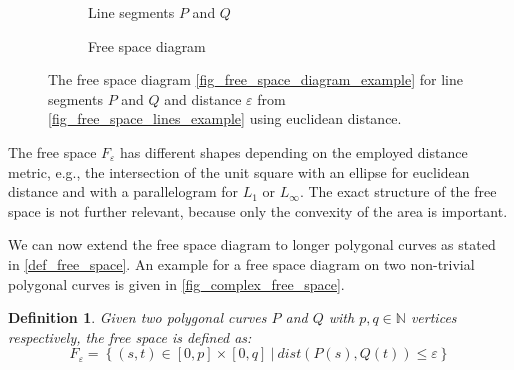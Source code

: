 \documentclass[
oneside,
fontsize=11pt
]{scrartcl}
\newtheorem{mydef}{Definition}
\begin{document}
\begin{figure}[ht]
  \centering
  \begin{subfigure}[b]{0.45\textwidth}
      \resizebox{\textwidth}{!}{
        
      }
      \caption{Line segments $P$ and $Q$}
      \label{fig_free_space_lines_example}
  \end{subfigure}
  \hfill
  \begin{subfigure}[b]{0.45\textwidth}
      \resizebox{\textwidth}{!}{
        
      }
      \caption{Free space diagram}
      \label{fig_free_space_diagram_example}
  \end{subfigure}
  \caption[Free space diagram example]{
    The free space diagram \autoref{fig_free_space_diagram_example} 
    for line segments $P$ and $Q$ and distance $\varepsilon$
    from \autoref{fig_free_space_lines_example} using euclidean distance.}
  \label{fig_free_space}
\end{figure}

The free space $F_\varepsilon$ has different shapes depending on the employed distance metric,
e.g.,  the intersection of the unit square with an ellipse for euclidean distance 
and with a parallelogram for $L_1$ or $L_\infty$. 
The exact structure of the free space is not further relevant, 
because only the convexity of the area is important. \cite{alt_computing_1995}

We can now extend the free space diagram to longer polygonal curves 
as stated in \autoref{def_free_space}.
An example for a free space diagram on two non-trivial polygonal curves is given in \autoref{fig_complex_free_space}.

\begin{mydef}
  \label{def_free_space}
  Given two polygonal curves $P$ and $Q$ with $p,q \in \mathbb{N}$ vertices respectively, 
  the free space is defined as:
  $$F_\varepsilon = \left\{ (s,t) \in [0,p] \times [0,q] \ | \ dist(P(s), Q(t)) \leq \varepsilon \right\}$$
\end{mydef}
\end{document}
